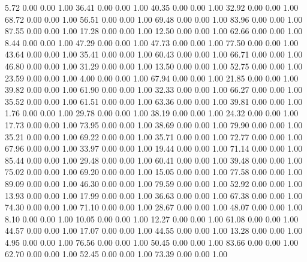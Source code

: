     5.72   0.00   0.00   1.00
   36.41   0.00   0.00   1.00
   40.35   0.00   0.00   1.00
   32.92   0.00   0.00   1.00
   68.72   0.00   0.00   1.00
   56.51   0.00   0.00   1.00
   69.48   0.00   0.00   1.00
   83.96   0.00   0.00   1.00
   87.55   0.00   0.00   1.00
   17.28   0.00   0.00   1.00
   12.50   0.00   0.00   1.00
   62.66   0.00   0.00   1.00
    8.44   0.00   0.00   1.00
   47.29   0.00   0.00   1.00
   47.73   0.00   0.00   1.00
   77.50   0.00   0.00   1.00
   43.64   0.00   0.00   1.00
   35.41   0.00   0.00   1.00
   60.43   0.00   0.00   1.00
   66.71   0.00   0.00   1.00
   46.80   0.00   0.00   1.00
   31.29   0.00   0.00   1.00
   13.50   0.00   0.00   1.00
   52.75   0.00   0.00   1.00
   23.59   0.00   0.00   1.00
    4.00   0.00   0.00   1.00
   67.94   0.00   0.00   1.00
   21.85   0.00   0.00   1.00
   39.82   0.00   0.00   1.00
   61.90   0.00   0.00   1.00
   32.33   0.00   0.00   1.00
   66.27   0.00   0.00   1.00
   35.52   0.00   0.00   1.00
   61.51   0.00   0.00   1.00
   63.36   0.00   0.00   1.00
   39.81   0.00   0.00   1.00
    1.76   0.00   0.00   1.00
   29.78   0.00   0.00   1.00
   38.19   0.00   0.00   1.00
   24.32   0.00   0.00   1.00
   17.73   0.00   0.00   1.00
   73.95   0.00   0.00   1.00
   38.69   0.00   0.00   1.00
   79.90   0.00   0.00   1.00
   35.21   0.00   0.00   1.00
   69.22   0.00   0.00   1.00
   35.71   0.00   0.00   1.00
   72.77   0.00   0.00   1.00
   67.96   0.00   0.00   1.00
   33.97   0.00   0.00   1.00
   19.44   0.00   0.00   1.00
   71.14   0.00   0.00   1.00
   85.44   0.00   0.00   1.00
   29.48   0.00   0.00   1.00
   60.41   0.00   0.00   1.00
   39.48   0.00   0.00   1.00
   75.02   0.00   0.00   1.00
   69.20   0.00   0.00   1.00
   15.05   0.00   0.00   1.00
   77.58   0.00   0.00   1.00
   89.09   0.00   0.00   1.00
   46.30   0.00   0.00   1.00
   79.59   0.00   0.00   1.00
   52.92   0.00   0.00   1.00
   13.93   0.00   0.00   1.00
   17.99   0.00   0.00   1.00
   36.63   0.00   0.00   1.00
   67.38   0.00   0.00   1.00
   74.30   0.00   0.00   1.00
   71.10   0.00   0.00   1.00
   28.67   0.00   0.00   1.00
   48.07   0.00   0.00   1.00
    8.10   0.00   0.00   1.00
   10.05   0.00   0.00   1.00
   12.27   0.00   0.00   1.00
   61.08   0.00   0.00   1.00
   44.57   0.00   0.00   1.00
   17.07   0.00   0.00   1.00
   44.55   0.00   0.00   1.00
   13.28   0.00   0.00   1.00
    4.95   0.00   0.00   1.00
   76.56   0.00   0.00   1.00
   50.45   0.00   0.00   1.00
   83.66   0.00   0.00   1.00
   62.70   0.00   0.00   1.00
   52.45   0.00   0.00   1.00
   73.39   0.00   0.00   1.00
